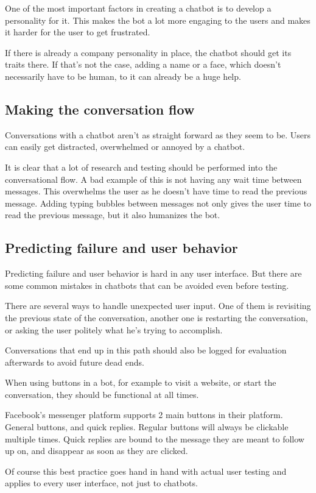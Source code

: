 One of the most important factors in creating a chatbot is to develop a personality for it. This makes the bot a lot more engaging to the users and makes it harder for the user to get frustrated.

If there is already a company personality in place, the chatbot should get its traits there. If that's not the case, adding a name or a face, which doesn't necessarily have to be human, to it can already be a huge help.

\subsection{Making the conversation flow}

Conversations with a chatbot aren't as straight forward as they seem to be. Users can easily get distracted, overwhelmed or annoyed by a chatbot.

It is clear that a lot of research and testing should be performed into the conversational flow. A bad example of this is not having any wait time between messages. This overwhelms the user as he doesn't have time to read the previous message. Adding typing bubbles between messages not only gives the user time to read the previous message, but it also humanizes the bot.

\subsection{Predicting failure and user behavior}

Predicting failure and user behavior is hard in any user interface. But there are some common mistakes in chatbots that can be avoided even before testing.

There are several ways to handle unexpected user input.
One of them is revisiting the previous state of the conversation, another one is restarting the conversation, or asking the user politely what he's trying to accomplish.

Conversations that end up in this path should also be logged for evaluation afterwards to avoid future dead ends.

When using buttons in a bot, for example to visit a website, or start the conversation, they should be functional at all times.

Facebook's messenger platform supports 2 main buttons in their platform. General buttons, and quick replies. Regular buttons will always be clickable multiple times. Quick replies are bound to the message they are meant to follow up on, and disappear as soon as they are clicked.

Of course this best practice goes hand in hand with actual user testing and applies to every user interface, not just to chatbots.